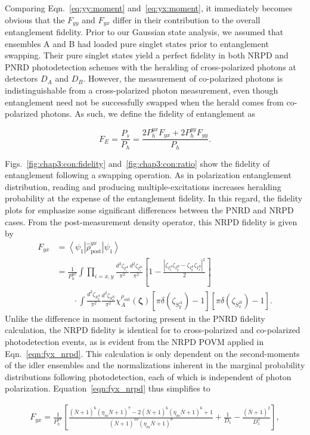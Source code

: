 \documentclass[aps,twocolumn,secnumarabic,amsmath,amssymb,pra,groupedaddress,
showpacs, showkeys]{revtex4-1}
\newcommand{\bra}[1]{\left\langle #1 \right|}
\newcommand{\ket}[1]{\left|#1\right\rangle}
\newcommand{\pna}[1]{\left(#1\right)}
\newcommand{\pnb}[1]{\left[#1\right]}
\newcommand{\eqn}[1]{
\begin{equation}
	#1
\end{equation}
}
\begin{document}
Comparing Eqn.~\ref{eq:yy:moment} and~\ref{eq:yx:moment}, it immediately
becomes obvious that the $F_{yy}$ and $F_{yx}$ differ in their contribution to
the overall entanglement fidelity. Prior to our Gaussian state analysis, we
assumed that ensembles A and B had loaded pure singlet states prior to
entanglement swapping. Their pure singlet states yield a perfect fidelity in
both NRPD and PNRD photodetection schemes with the heralding of cross-polarized
photons at detectors $D_A$ and $D_B$. However, the measurement of co-polarized
photons is indistinguishable from a cross-polarized photon measurement, even
though entanglement need not be successfully swapped when the herald comes from
co-polarized photons. As such, we define the fidelity of entanglement as
\eqn{
F_E = \frac{P_{s}}{P_{h}}=  \frac{2P_{h}^{yx}F_{yx}+2P_{h}^{yy}F_{yy}}{P_{h}}.
}
Figs.~\ref{fig:chap3:con:fidelity} and~\ref{fig:chap3:con:ratio} show the
fidelity of entanglement following a swapping operation. As in polarization
entanglement distribution, reading and producing multiple-excitations increases
heralding probability at the expense of the entanglement fidelity. In this
regard, the fidelity plots for emphasize some significant differences between
the PNRD and NRPD cases. From the post-measurement density operator, this NRPD
fidelity is given by
\begin{align}
F_{yx} & = \bra{\psi_{1}} \hat{\rho}_{\textrm{post}}^{yx} \ket{\psi_1} \nonumber \\
& =\frac{1}{P_{h}^{yx}}\int 
\prod_{i=x,y}
\frac{d^2 \zeta_{I_i^A}}{\pi^2} 
\frac{d^2 \zeta_{I_i^B}}{\pi^2} 
\pnb{1-\frac{|\zeta_{I_x^A}\zeta_{I_y^B}-\zeta_{I_y^A}\zeta_{I_x^B}|^2}{2}}  \nonumber \\
& \qquad \cdot \int 
\frac{d^2 \zeta_{S_y^A}}{\pi^2} 
\frac{d^2 \zeta_{S_x^B}}{\pi^2}
\chi_A^{\rho_{\textrm{out}}}\pna{\bm{\zeta}} 
\pnb{\pi\delta\pna{\zeta_{S_y^A}}-1}\pnb{\pi\delta\pna{\zeta_{S_x^B}}-1}.\label{eqn:fyx_nrpd}
\end{align}
Unlike the difference in moment factoring present in the PNRD fidelity
calculation, the NRPD fidelity is identical for to cross-polarized and
co-polarized photodetection events, as is evident from the NRPD POVM applied in
Eqn.~\ref{eqn:fyx_nrpd}. This calculation is only dependent on the
second-moments of the idler ensembles and the normalizations inherent in the
marginal probability distributions following photodetection, each of which is
independent of photon polarization. Equation~\ref{eqn:fyx_nrpd} thus simplifies
to
\begin{widetext}
\begin{align}
    F_{yx}=\frac{1}{P_{h}^{yx}}\pnb{\frac{(\bar{N}+1)^6 (\eta_{m}
        \bar{N}+1)^7-2 (\bar{N}+1)^6 (\eta_{m}
        \bar{N}+1)^6+1}{(\bar{N}+1)^{10} (\eta_{m}  \bar{N}+1)^9} +\frac{1}{D_1}-\frac{\pna{\bar{N}+1}^2}{D_1^3}},
\end{align}
\end{widetext}
\end{document}

